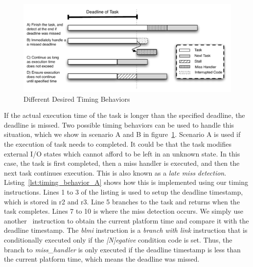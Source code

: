 \begin{figure}
  \vspace{-15pt}
  \begin{center}
    \includegraphics[scale=.7]{figs/timing_behaviors.pdf}
  \end{center}
  \vspace{-3mm}
  \caption{Different Desired Timing Behaviors}
  \label{fig:timing_behaviors}
\end{figure}

If the actual execution time of the task is longer than the specified deadline, the deadline is missed. 
Two possible timing behaviors can be used to handle this situation, which we show in scenario A and B in figure~\ref{fig:timing_behaviors}. 
Scenario A is used if the execution of task needs to completed. 
It could be that the task modifies external I/O states which cannot afford to be left in an unknown state.
In this case, the task is first completed, then a miss handler is executed, and then the next task continues execution.
This is also known as a \emph{late miss detection}.  
Listing~\ref{lst:timing_behavior_A} shows how this is implemented using our timing instructions.
Lines 1 to 3 of the listing is used to setup the deadline timestamp, which is stored in r2 and r3.  
Line 5 branches to the task and returns when the task completes.
Lines 7 to 10 is where the miss detection occurs. 
We simply use another \gettime\ instruction to obtain the current platform time and compare it with the deadline timestamp.
The \emph{blmi} instruction is a \emph{branch with link} instruction that is conditionally executed only if the \emph{[N]egative} condition code is set.
Thus, the branch to \emph{miss\_handler} is only executed if the deadline timestamp is less than the current platform time, which means the deadline was missed.

